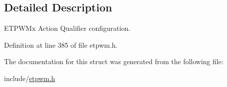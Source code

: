 \subsection{Detailed Description}
E\+T\+P\+W\+Mx Action Qualifier configuration. 

Definition at line 385 of file etpwm.\+h.



The documentation for this struct was generated from the following file\+:\begin{DoxyCompactItemize}
\item 
include/\mbox{\hyperlink{etpwm_8h}{etpwm.\+h}}\end{DoxyCompactItemize}
